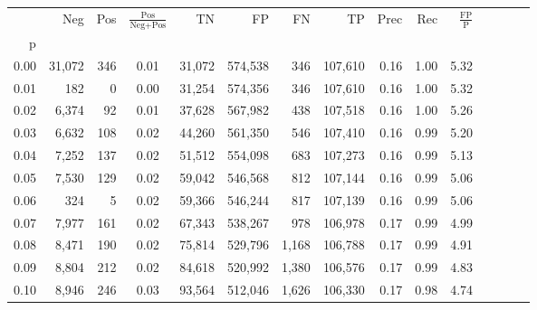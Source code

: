 \begin{tabular}{rrrcrrrrrrrrrrr}
\toprule
{} &     Neg &    Pos & $\frac{\text{Pos}}{\text{Neg}+\text{Pos}}$ &       TN &       FP &       FN &       TP &  Prec &   Rec & $\frac{\text{FP}}{\text{P}}$ \\
p    &         &        &                                            &          &          &          &          &       &       &                              \\
\midrule
0.00 &  31,072 &    346 &                                       0.01 &   31,072 &  574,538 &      346 &  107,610 &  0.16 &  1.00 &                         5.32 \\
0.01 &     182 &      0 &                                       0.00 &   31,254 &  574,356 &      346 &  107,610 &  0.16 &  1.00 &                         5.32 \\
0.02 &   6,374 &     92 &                                       0.01 &   37,628 &  567,982 &      438 &  107,518 &  0.16 &  1.00 &                         5.26 \\
0.03 &   6,632 &    108 &                                       0.02 &   44,260 &  561,350 &      546 &  107,410 &  0.16 &  0.99 &                         5.20 \\
0.04 &   7,252 &    137 &                                       0.02 &   51,512 &  554,098 &      683 &  107,273 &  0.16 &  0.99 &                         5.13 \\
0.05 &   7,530 &    129 &                                       0.02 &   59,042 &  546,568 &      812 &  107,144 &  0.16 &  0.99 &                         5.06 \\
0.06 &     324 &      5 &                                       0.02 &   59,366 &  546,244 &      817 &  107,139 &  0.16 &  0.99 &                         5.06 \\
0.07 &   7,977 &    161 &                                       0.02 &   67,343 &  538,267 &      978 &  106,978 &  0.17 &  0.99 &                         4.99 \\
0.08 &   8,471 &    190 &                                       0.02 &   75,814 &  529,796 &    1,168 &  106,788 &  0.17 &  0.99 &                         4.91 \\
0.09 &   8,804 &    212 &                                       0.02 &   84,618 &  520,992 &    1,380 &  106,576 &  0.17 &  0.99 &                         4.83 \\
0.10 &   8,946 &    246 &                                       0.03 &   93,564 &  512,046 &    1,626 &  106,330 &  0.17 &  0.98 &                         4.74 \\

\end{tabular}
